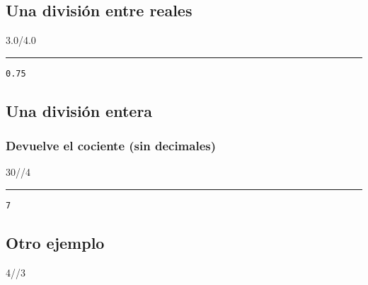 \documentclass[]{article}
\newenvironment{Shaded}{}{}
\newcommand{\DecValTok}[1]{\textcolor[rgb]{0.25,0.63,0.44}{#1}}
\newcommand{\FloatTok}[1]{\textcolor[rgb]{0.25,0.63,0.44}{#1}}
\newcommand{\OperatorTok}[1]{\textcolor[rgb]{0.40,0.40,0.40}{#1}}
\begin{document}
\subsection{Una división entre
reales}\label{una-divisiuxf3n-entre-reales}

\begin{Shaded}
\begin{Highlighting}[]
\FloatTok{3.0}\OperatorTok{/}\FloatTok{4.0}
\end{Highlighting}
\end{Shaded}

\begin{center}\rule{0.5\linewidth}{\linethickness}\end{center}

\begin{verbatim}
0.75
\end{verbatim}

\subsection{Una división entera}\label{una-divisiuxf3n-entera}

\subsubsection{Devuelve el cociente (sin
decimales)}\label{devuelve-el-cociente-sin-decimales}

\begin{Shaded}
\begin{Highlighting}[]
\DecValTok{30}\OperatorTok{//}\DecValTok{4}
\end{Highlighting}
\end{Shaded}

\begin{center}\rule{0.5\linewidth}{\linethickness}\end{center}

\begin{verbatim}
7
\end{verbatim}

\subsection{Otro ejemplo}\label{otro-ejemplo}

\begin{Shaded}
\begin{Highlighting}[]
\DecValTok{4}\OperatorTok{//}\DecValTok{3}
\end{Highlighting}
\end{Shaded}
\end{document}
